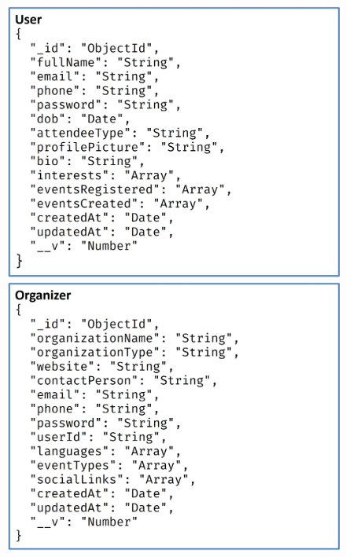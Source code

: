 \documentclass[twoside,a4paper,openright]{report} %
\begin{document}
\begin{figure}[ht]
	\centering
	\begin{minipage}{0.45\textwidth}
		\centering
		\includegraphics[scale=0.45]{table1.jpg}     
	\end{minipage}\hfill
	\begin{minipage}{0.45\textwidth}
		\centering
		\includegraphics[scale=0.45]{table2.jpg}     
	\end{minipage}
	
	\vspace{1cm} %
	

\end{figure}
\end{document}
